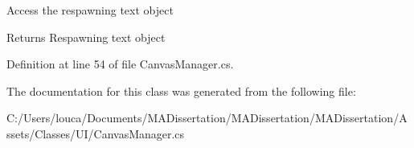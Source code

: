 Access the respawning text object 

\begin{DoxyReturn}{Returns}
Respawning text object
\end{DoxyReturn}


Definition at line 54 of file Canvas\+Manager.\+cs.



The documentation for this class was generated from the following file\+:\begin{DoxyCompactItemize}
\item 
C\+:/\+Users/louca/\+Documents/\+M\+A\+Dissertation/\+M\+A\+Dissertation/\+M\+A\+Dissertation/\+Assets/\+Classes/\+U\+I/Canvas\+Manager.\+cs\end{DoxyCompactItemize}
